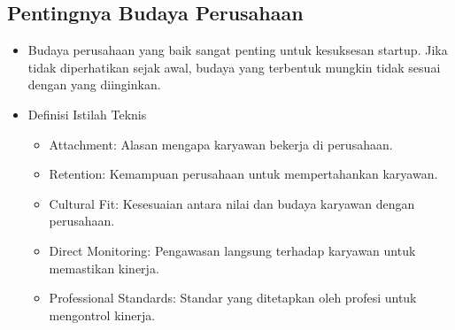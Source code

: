 \documentclass{article}
\begin{document}
\subsection{Pentingnya Budaya Perusahaan}
\begin{itemize}
    \item Budaya perusahaan yang baik sangat penting untuk kesuksesan startup. Jika tidak diperhatikan sejak awal, budaya yang terbentuk mungkin tidak sesuai dengan yang diinginkan.
    \item Definisi Istilah Teknis
          \begin{itemize}
              \item Attachment: Alasan mengapa karyawan bekerja di perusahaan.
              \item Retention: Kemampuan perusahaan untuk mempertahankan karyawan.
              \item Cultural Fit: Kesesuaian antara nilai dan budaya karyawan dengan perusahaan.
              \item Direct Monitoring: Pengawasan langsung terhadap karyawan untuk memastikan kinerja.
              \item Professional Standards: Standar yang ditetapkan oleh profesi untuk mengontrol kinerja.
          \end{itemize}
\end{itemize}
\end{document}
